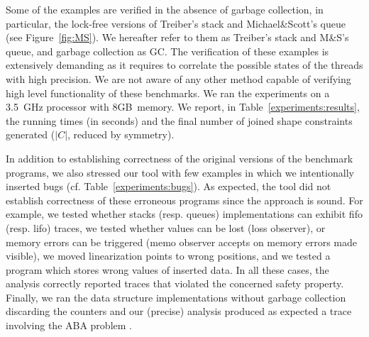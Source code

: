 Some of the examples are verified in the absence of garbage
collection,
%
in particular, the lock-free versions of Treiber's
\cite{Treiber:stack} stack and Michael\&Scott's queue (see
Figure~\ref{fig:MS}).  We hereafter refer to them as Treiber's stack
and M\&S's queue, and garbage collection as GC.
%
The verification of these examples is extensively demanding as it
requires to correlate the possible states of the threads with high
precision.
%
We are not aware of any other method capable of verifying high level functionality of these benchmarks.
%
We ran the experiments on a 3.5~GHz processor with 8GB~memory. We
report, in Table~\ref{experiments:results}, the running times (in
seconds) and the final number of joined shape constraints generated
($|C|$, reduced by symmetry). 
%

In addition to establishing correctness of the original versions of
the benchmark programs, we also stressed our tool with few examples in
which we intentionally inserted bugs (cf. Table~\ref{experiments:bugs}).
%
As expected, the tool did not establish correctness of these erroneous
programs since the approach is sound.
%
For example, we tested whether stacks (resp. queues) implementations
can exhibit fifo (resp. lifo) traces,
%
we tested whether values can be lost (loss observer),
or memory errors can be triggered (memo observer accepts 
on memory errors made visible),
%
we moved linearization points to wrong positions,
%
and we tested a program which stores wrong values of inserted data. 
%
In all these cases, the analysis correctly reported traces that 
violated the concerned safety property.
%
Finally, we ran the data structure implementations without garbage
collection discarding the  counters and our (precise)
analysis produced as expected a trace involving the ABA problem \cite{aba:1983}.
%

%
%

